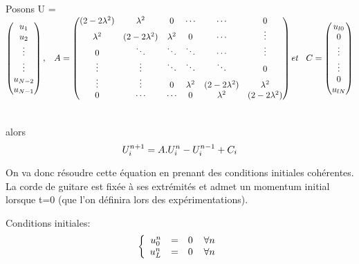 Posons U = 
\begin{math}
\begin{pmatrix}
u_{1}\\
u_{2}\\
\vdots \\
\vdots \\
u_{N-2}\\
u_{N-1}
\end{pmatrix}
, \hspace{3 mm} A = 
\begin{pmatrix}
(2-2\lambda ^2) & \lambda ^2 & 0 & \cdots & \cdots & 0\\
\lambda ^2 & (2-2\lambda ^2) & \lambda ^2 & 0 & \cdots & \vdots\\
0 & \ddots & \ddots & \ddots & \cdots & \vdots\\
\vdots & \vdots & \ddots & \ddots & \ddots & 0\\
\vdots & \vdots & 0 &\lambda ^2 & (2-2\lambda ^2) & \lambda ^2 \\
0 & \cdots & \cdots & 0 & \lambda ^2 & (2-2\lambda ^2)
\end{pmatrix}
et \hspace{3 mm} C = 
\begin{pmatrix}
u_{l0}\\
0\\
\vdots \\
\vdots \\
0\\
u_{lN}
\end{pmatrix}
\end{math}

\vspace*{7 mm}\\
alors\\

\begin{equation*}
U^{n+1}_i = A.U^{n}_i - U^{n-1}_i + C_i\\
\end{equation*}

On va donc résoudre cette équation en prenant des conditions initiales cohérentes. La corde de guitare est fixée à ses extrémités et admet un momentum initial lorsque t=0 (que l'on définira lors des expérimentations).

Conditions initiales: 
\begin{equation*}
\left \{
\begin{array}{rcl}
u^{n}_{0}& = & 0 \hspace*{4 mm} \forall n\\
u^{n}_{L}& = &0 \hspace*{4 mm} \forall n\\
\end{array}
\right.
\end{equation*}

